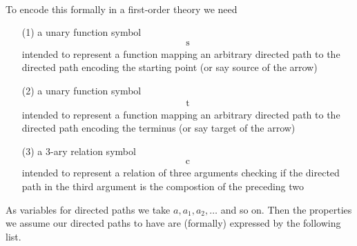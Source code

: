 \\
To encode this formally in a first-order theory we need
\begin{enumerate}
\item[(1)]
a unary function symbol
\begin{align*}
  \mathrm{s}
\end{align*}
intended to represent a function mapping an arbitrary directed path to the directed path encoding the starting point (or say source of the arrow)
\item[(2)]
a unary function symbol
\begin{align*}
  \mathrm{t}
\end{align*}
intended to represent a function mapping an arbitrary directed path to the directed path encoding the terminus (or say target of the arrow)
\item[(3)]
a $3$-ary relation symbol
\begin{align*}
  \mathrm{c}
\end{align*}
intended to represent a relation of three arguments checking if the directed path in the third argument is the compostion of the preceding two
\end{enumerate}
As variables for directed paths we take $a,a_{1},a_{2},\ldots$ and so on. Then the properties we assume our directed paths to have are (formally) expressed by the following list.
